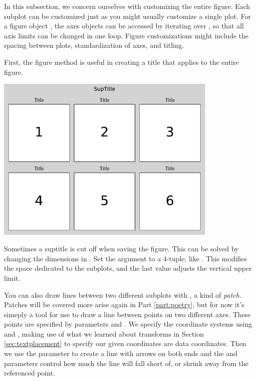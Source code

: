 In this subsection, we concern ourselves with customizing the entire figure. Each subplot can be customized just as you might usually customize a single plot. For a figure object , the axes objects can be accessed by iterating over , so that all axis limits can be changed in one loop. Figure customizations might include the spacing between plots, standardization of axes, and titling. 

First, the figure method  is useful in creating a title that applies to the entire figure. 



\begin{center}
    \includegraphics[width = 0.8\textwidth]{figures/proseplots/suptitle.pdf}
\end{center}


Sometimes a suptitle is cut off when saving the figure. This can be solved by changing the dimensions in . Set the  argument to a 4-tuple, like . This modifies the space dedicated to the subplots, and the last value adjusts the vertical upper limit. 


You can also draw lines between two different subplots with , a kind of \emph{patch}. Patches will be covered more arise again in Part \ref{part:poetry}, but for now it's simeply a tool for use to draw a line between points on two different axes. These points are specified by parameters  and . We specify the coordinate systems using  and , making use of what we learned about transforms in Section \ref{sec:textplacement} to specify our given coordinates are data coordinates. Then we use the  parameter to create a line with arrows on both ends and the  and  parameters control how much the line will fall short of, or shrink away from the referenced point.  

